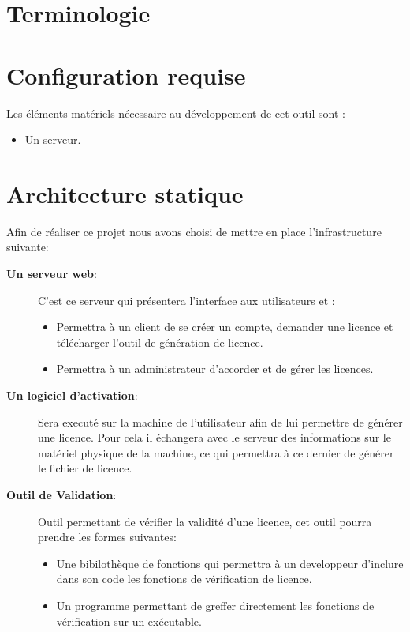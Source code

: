 \chapter{Terminologie}

\chapter{Configuration requise}

Les éléments matériels nécessaire au développement de cet outil sont :

\begin{itemize}
    \item Un serveur.
\end{itemize}

\chapter{Architecture statique}
Afin de réaliser ce projet nous avons choisi de mettre en place l'infrastructure suivante:

\begin{description}
	\item[\textbf{Un serveur web}:]
		C'est ce serveur qui présentera l'interface aux utilisateurs et :
		\begin{itemize}
			\item Permettra à un client de se créer un compte, demander une licence et 
			télécharger l'outil de génération de licence.
			\item Permettra à un administrateur d'accorder et de gérer les licences. 
		\end{itemize}
	\item[\textbf{Un logiciel d'activation}:] 
		Sera executé sur la machine de l'utilisateur
		afin de lui permettre de générer une licence. Pour cela il échangera avec
		le serveur des informations sur le matériel physique de la machine, ce 
		qui permettra à ce dernier de générer le fichier de licence.
	\item[\textbf{Outil de Validation}:]
		Outil permettant de vérifier la validité d'une licence, cet outil
		pourra prendre les formes suivantes: 
		\begin{itemize}
		\item Une bibilothèque de fonctions qui permettra à un developpeur d'inclure
		dans son code les fonctions de vérification de licence. 
		\item Un programme permettant de greffer directement les fonctions de vérification
		sur un exécutable. 
		\end{itemize}
\end{description}

